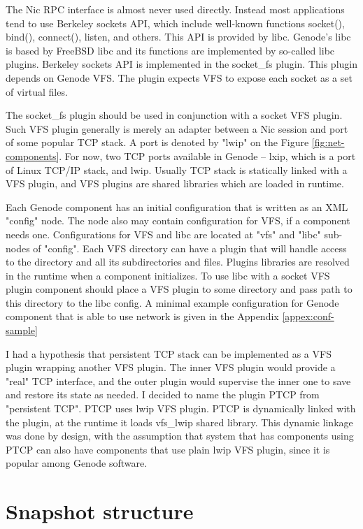 The Nic RPC interface is almost never used directly. Instead most applications
tend to use Berkeley sockets API, which include well-known functions socket(),
bind(), connect(), listen, and others. This API is provided by libc. Genode's
libc is based by FreeBSD libc and its functions are implemented by so-called
libc plugins. Berkeley sockets API is implemented in the socket\_fs plugin.
This plugin depends on Genode VFS. The plugin expects VFS to expose each socket
as a set of virtual files.

The socket\_fs plugin should be used in conjunction with a socket VFS plugin. 
Such VFS plugin generally is merely an adapter between a Nic session and port
of some popular TCP stack. A port is denoted by "lwip" on the Figure
\ref{fig:net-components}. For now, two TCP ports available in Genode -- lxip,
which is a port of Linux TCP/IP stack, and lwip. Usually TCP stack is
statically linked with a VFS plugin, and VFS plugins are shared libraries which
are loaded in runtime.

Each Genode component has an initial configuration that is written as an XML
"config" node. The node also may contain configuration for VFS, if a component
needs one. Configurations for VFS and libc are located at "vfs" and "libc"
sub-nodes of "config". Each VFS directory can have a plugin that will handle
access to the directory and all its subdirectories and files. Plugins libraries
are resolved in the runtime when a component initializes. To use libc with a
socket VFS plugin component should place a VFS plugin to some directory and
pass path to this directory to the libc config. A minimal example configuration
for Genode component that is able to use network is given in the Appendix
\ref{appex:conf-sample}

I had a hypothesis that persistent TCP stack can be implemented as a VFS plugin
wrapping another VFS plugin. The inner VFS plugin would provide a "real" 
TCP interface, and the outer plugin would supervise the inner one to save and
restore its state as needed. I decided to name the plugin PTCP from "persistent
TCP". PTCP uses lwip VFS plugin. PTCP is dynamically linked with the plugin, at
the runtime it loads vfs\_lwip shared library. This dynamic linkage was done by
design, with the assumption that system that has components using PTCP can also
have components that use plain lwip VFS plugin, since it is popular among
Genode software.

\section{Snapshot structure}


